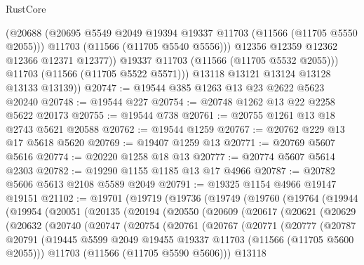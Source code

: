 \begin{lexlean}{RustCore}
\begin{coremodule}
                (@20688
                  (@20695 @5549 @2049 @19394 @19337 @11703 (@11566 (@11705 @5550 @2055)))
                  @11703
                  (@11566 (@11705 @5540 @5556)))
                @12356
                @12359
                @12362
                @12366
                @12371
                @12377))
            @19337
            @11703
            (@11566 (@11705 @5532 @2055)))
          @11703
          (@11566 (@11705 @5522 @5571)))
        @13118
        @13121
        @13124
        @13128
        @13133
        @13139))
@20747 := @19544 @385 @1263 @13 @23 @2622 @5623 @20240
@20748 := @19544 @227
@20754 := @20748 @1262 @13 @22 @2258 @5622 @20173
@20755 := @19544 @738
@20761 := @20755 @1261 @13 @18 @2743 @5621 @20588
@20762 := @19544 @1259
@20767 := @20762 @229 @13 @17 @5618 @5620
@20769 := @19407 @1259 @13
@20771 := @20769 @5607 @5616
@20774 := @20220 @1258 @18 @13
@20777 := @20774 @5607 @5614 @2303
@20782 := @19290 @1155 @1185 @13 @17 @4966
@20787 := @20782 @5606 @5613 @2108 @5589 @2049
@20791 := @19325 @1154 @4966 @19147 @19151
@21102 := @19701
    (@19719
      (@19736
        (@19749
          (@19760
            (@19764
              (@19944
                (@19954
                  (@20051
                    (@20135
                      (@20194
                        (@20550
                          (@20609
                            (@20617
                              (@20621
                                (@20629
                                  (@20632
                                    (@20740
                                      (@20747
                                        (@20754
                                          (@20761
                                            (@20767
                                              (@20771
                                                (@20777
                                                  (@20787
                                                    @20791
                                                    (@19445
                                                      @5599
                                                      @2049
                                                      @19455
                                                      @19337
                                                      @11703
                                                      (@11566 (@11705 @5600 @2055)))
                                                    @11703
                                                    (@11566 (@11705 @5590 @5606)))
                                                  @13118

\end{coremodule}
\end{lexlean}
